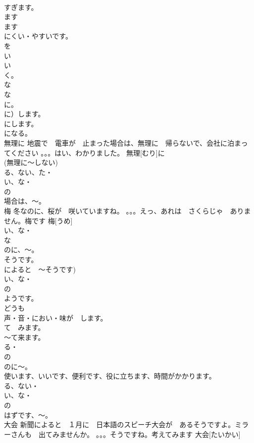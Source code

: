 \documentclass[8pt]{extreport}
\begin{document}
\begin{CJK}{UTF8}{min}
\\	すぎます。
\\	ます　
\\	ます
\\	にくい・やすいです。
\\	を
\\	い
\\	い
\\	く。
\\	な
\\	な
\\	に。
\\	に）します。
\\	にします。
\\	になる。
\\	無理に	地震で　電車が　止まった場合は、無理に　帰らないで、会社に泊まってください 。。。はい、わかりました。	無理[むり]に			
\\	(無理に～しない)	
\\	る、ない、た・
\\	い、な・
\\	の
\\	場合は、～。
\\	梅	冬なのに、桜が　咲いていますね。 。。。えっ、あれは　さくらじゃ　ありません。梅です	梅[うめ]			
\\	い、な・
\\	な
\\	のに、～。
\\	そうです。
\\	によると　～そうです) 
\\	い、な・
\\	の
\\	ようです。
\\	どうも
\\	声・音・におい・味が　します。
\\	て　みます。
\\	～て来ます。
\\	る・
\\	の　
\\	のに～。
\\	使います、いいです、便利です、役に立ちます、時間がかかります。 
\\	る、ない・
\\	い、な・
\\	の
\\	はずです、～。
\\	大会	新聞によると　１月に　日本語のスピーチ大会が　あるそうですよ。ミラーさんも　出てみませんか。 。。。そうですね。考えてみます	大会[たいかい]			

\end{CJK}
\end{document}
